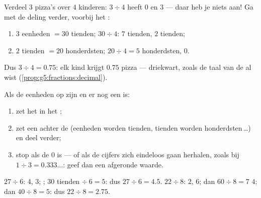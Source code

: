 \begin{example}\label{ex:g5:division:decimal}
Verdeel $3$ pizza's over $4$ kinderen: $3 \div 4$ heeft  $0$ en 
$3$ --- daar heb je niets aan! Ga met de deling verder, voorbij het
:
\begin{enumerate}
  \item $3$ eenheden $= 30$ tienden; $30 \div 4$: $7$ tienden,  $2$
        tienden;
  \item $2$ tienden $= 20$ honderdsten; $20 \div 4 = 5$ honderdsten, 
        $0$.
\end{enumerate}
Dus $3 \div 4 = 0.75$: elk kind krijgt $0.75$ pizza --- driekwart, zoals de
taal van de  al wist (\cref{prop:g5:fractions:decimal}).
\end{example}

\begin{method}\label{met:g5:division:continue}
Als de eenheden op zijn en er nog een  is:
\begin{enumerate}
  \item zet het  in het ;
  \item zet een  achter de  (eenheden worden tienden, tienden worden
        honderdsten\,\dots) en deel verder;
  \item stop als de  $0$ is --- of als de cijfers zich eindeloos gaan
        herhalen, zoals bij $1 \div 3 = 0.333\dots$: geef dan een afgeronde
        waarde.
\end{enumerate}
\end{method}

\begin{example}\label{ex:g5:division:continue}
$27 \div 6$:  $4$,  $3$; ; $30$ tienden
$\div\ 6 = 5$: dus $27 \div 6 = 4.5$. \quad
$22 \div 8$: $2$,  $6$; dan $60 \div 8 = 7$  $4$; dan
$40 \div 8 = 5$: dus $22 \div 8 = 2.75$.
\end{example}

